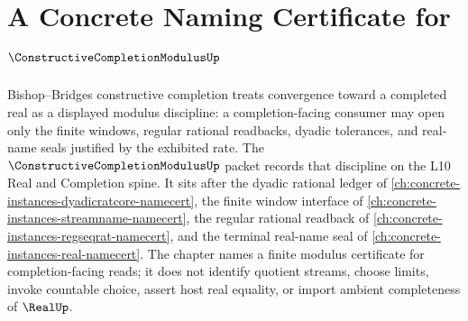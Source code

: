 \chapter{A Concrete Naming Certificate for $\ConstructiveCompletionModulusUp$}
\label{ch:concrete-instances-constructive-completion-modulus-namecert}

Bishop--Bridges constructive completion treats convergence toward a completed real as a displayed modulus discipline: a completion-facing consumer may open only the finite windows, regular rational readbacks, dyadic tolerances, and real-name seals justified by the exhibited rate. The $\ConstructiveCompletionModulusUp$ packet records that discipline on the L10 Real and Completion spine. It sits after the dyadic rational ledger of \autoref{ch:concrete-instances-dyadicratcore-namecert}, the finite window interface of \autoref{ch:concrete-instances-streamname-namecert}, the regular rational readback of \autoref{ch:concrete-instances-regseqrat-namecert}, and the terminal real-name seal of \autoref{ch:concrete-instances-real-namecert}. The chapter names a finite modulus certificate for completion-facing reads; it does not identify quotient streams, choose limits, invoke countable choice, assert host real equality, or import ambient completeness of $\RealUp$.

